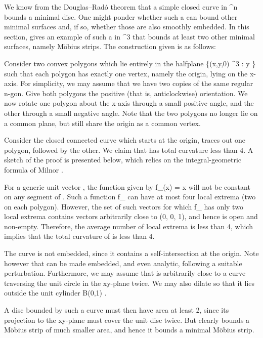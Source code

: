 \documentclass[a4paper, 11pt]{article}
\theoremstyle{plain}
\theoremstyle{definition}
\theoremstyle{remark}
\numberwithin{equation}{subsection}
\def\({}
\def\){}
\def\pi{}
\begin{document}
We know from the Douglas--Rad{\'o} theorem that a simple closed curve \(\Gamma\) in \(^{n}\) bounds a minimal disc. One might ponder whether such a \(\Gamma\) can bound other minimal surfaces and, if so, whether those are also smoothly embedded. In this section, \cite{EWW02} gives an example of such a \(\Gamma\) in \(^{3}\) that bounds at least two other minimal surfaces, namely M{\"o}bius strips. The construction given is as follows:

Consider two convex polygons which lie entirely in the halfplane \(\{(x,y,0) \in {}^{3} : y \}\) such that each polygon has exactly one vertex, namely the origin, lying on the \(x\)-axis. For simplicity, we may assume that we have two copies of the same regular \(n\)-gon. Give both polygons the positive (that is, anticlockwise) orientation. We now rotate one polygon about the \(x\)-axis through a small positive angle, and the other through a small negative angle. Note that the two polygons no longer lie on a common plane, but still share the origin as a common vertex.

Consider the closed connected curve \(\Gamma\) which starts at the origin, traces out one polygon, followed by the other. We claim that \(\Gamma\) has total curvature less than \(4\pi\). A sketch of the proof is presented below, which relies on the integral-geometric formula of Milnor \cite[Theorem 3.1]{Mil50}.

For a generic unit vector \(\), the function given by \(f_{}(x) =  \cdot x\) will not be constant on any segment of \(\Gamma\). Such a function \(f_{}\) can have at most four local extrema (two on each polygon). However, the set of such vectors \(\) for which \(f_{}\) has only two local extrema contains vectors arbitrarily close to \((0, 0, 1)\), and hence is open and non-empty. Therefore, the average number of local extrema is less than 4, which implies that the total curvature of \(\Gamma\) is less than \(4\pi\).

The curve \(\Gamma\) is not embedded, since it contains a self-intersection at the origin. Note however that \(\Gamma\) can be made embedded, and even analytic, following a suitable perturbation. Furthermore, we may assume that \(\Gamma\) is arbitrarily close to a curve traversing the unit circle in the \(xy\)-plane twice. We may also dilate \(\Gamma\) so that it lies outside the unit cylinder \(B(0,1) \times {}\).

A disc bounded by such a curve \(\Gamma\) must then have area at least \(2\pi\), since its projection to the \(xy\)-plane must cover the unit disc twice. But clearly \(\Gamma\) bounds a M{\"o}bius strip of much smaller area, and hence it bounds a minimal M{\"o}bius strip.
\end{document}
